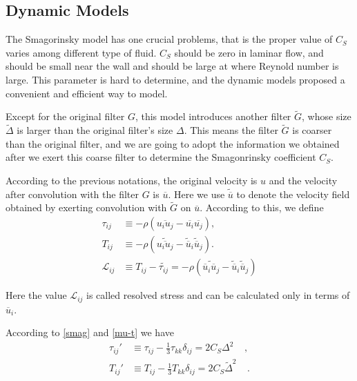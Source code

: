\documentclass[english, nochinese]{pkupaper}
\begin{document}
\subsection{Dynamic Models}
\par The Smagorinsky model has one crucial problems, that is the proper value of $C_S$ varies among different type of fluid. $C_S$ should be zero in laminar flow, and should be small near the wall and should be large at where Reynold number is large. This parameter is hard to determine, and the dynamic models proposed a convenient and efficient way to model.
\par Except for the original filter $G$, this model introduces another filter $\widetilde{G}$, whose size $\widetilde{\Delta}$ is larger than the original filter's size $\Delta$. This means the filter $\widetilde{G}$ is coarser than the original filter, and we are going to adopt the information we obtained after we exert this coarse filter to determine the Smagonrinsky coefficient $C_S$.
\par According to the previous notations, the original velocity is $u$ and the velocity after convolution with the filter $G$ is $\overline{u}$. Here we use $\widetilde{\overline{u}}$ to denote the velocity field obtained by exerting convolution with $\widetilde{G}$ on $\overline{u}$. According to this, we define
\begin{equation}
	\begin{aligned}
		\tau_{ij} & \equiv -\rho(\overline{u_iu_j} - \overline{u_i}\overline{u_j}),\\
		T_{ij} & \equiv -\rho(\widetilde{\overline{u_iu_j}} - \widetilde{\overline{u}}_i\widetilde{\overline{u}}_j).\\
		\mathcal{L}_{ij} & \equiv T_{ij} - \widetilde{\tau_{ij}} = -\rho(\widetilde{\overline{u}_i\overline{u}_j} - \widetilde{\overline{u}}_i\widetilde{\overline{u}}_j)
	\end{aligned}
\end{equation}
\par Here the value $\mathcal{L}_{ij}$ is called resolved stress and can be calculated only in terms of $\overline{u}_i$.
\par According to \eqref{smag} and \eqref{mu-t} we have 
\begin{equation}
	\begin{aligned}
		\tau_{ij}' & \equiv \tau_{ij} - \frac{1}{3}\tau_{kk}\delta_{ij} = 2C_S\Delta^2\mathop{\overline{S}}\mathop{\overline{S}_{ij}},\\
		T_{ij}' & \equiv T_{ij} - \frac{1}{3}T_{kk}\delta_{ij} = 2C_S\widetilde{\Delta}^2\mathop{\widetilde{\overline{S}}}\mathop{\widetilde{\overline{S}}_{ij}}.
	\end{aligned}
\end{equation}
\end{document}
